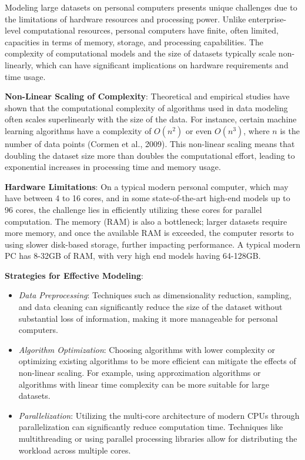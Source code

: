 \documentclass[12pt, twoside,hidelinks]{article}
\theoremstyle{definition}
\numberwithin{equation}{section}
\begin{document}
Modeling large datasets on personal computers presents unique challenges due to the limitations of hardware resources and processing power. Unlike enterprise-level computational resources, personal computers have finite, often limited, capacities in terms of memory, storage, and processing capabilities. The complexity of computational models and the size of datasets typically scale non-linearly, which can have significant implications on hardware requirements and time usage.

\textbf{Non-Linear Scaling of Complexity}: Theoretical and empirical studies have shown that the computational complexity of algorithms used in data modeling often scales superlinearly with the size of the data. For instance, certain machine learning algorithms have a complexity of \( O(n^2) \) or even \( O(n^3) \), where \( n \) is the number of data points (Cormen et al., 2009). This non-linear scaling means that doubling the dataset size more than doubles the computational effort, leading to exponential increases in processing time and memory usage.

\textbf{Hardware Limitations}: On a typical modern personal computer, which may have between 4 to 16 cores, and in some state-of-the-art high-end models up to 96 cores, the challenge lies in efficiently utilizing these cores for parallel computation. The memory (RAM) is also a bottleneck; larger datasets require more memory, and once the available RAM is exceeded, the computer resorts to using slower disk-based storage, further impacting performance. A typical modern PC has 8-32GB of RAM, with very high end models having 64-128GB. 

\textbf{Strategies for Effective Modeling}:
\begin{itemize}
     \item \textit{Data Preprocessing}: Techniques such as dimensionality reduction, sampling, and data cleaning can significantly reduce the size of the dataset without substantial loss of information, making it more manageable for personal computers.
    \item \textit{Algorithm Optimization}: Choosing algorithms with lower complexity or optimizing existing algorithms to be more efficient can mitigate the effects of non-linear scaling. For example, using approximation algorithms or algorithms with linear time complexity can be more suitable for large datasets.
    \item \textit{Parallelization}: Utilizing the multi-core architecture of modern CPUs through parallelization can significantly reduce computation time. Techniques like multithreading or using parallel processing libraries allow for distributing the workload across multiple cores.
\end{itemize}
\end{document}
